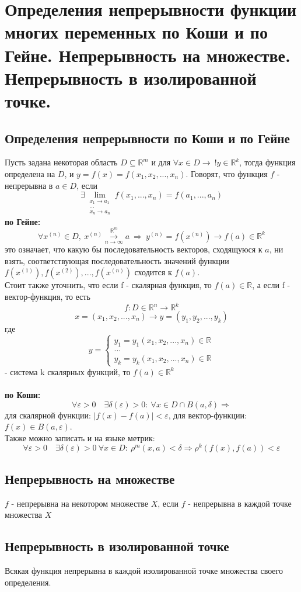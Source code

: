 \section{Определения непрерывности функции многих переменных по Коши и по Гейне.
Непрерывность на множестве.
Непрерывность в изолированной точке.}
\subsection{Определения непрерывности по Коши и по Гейне}
Пусть задана некоторая область $D \subseteq \mathbb{R}^m$ и для $ \forall x \in D \rightarrow \ ! y \in \mathbb{R}^{k}$, тогда функция определена на $D$, и $y=f(x)=f(x_{1}, x_{2}, ... , x_{n})$. Говорят, что функция $f$ - непрерывна в $a \in D$, если
$$
\exists \lim_{\substack{x_{1}\to a_{1}\\ ... \\{x_{n}\to a_{n}}}}{f(x_{1},..., x_{n})} = f(a_{1},..., a_{n})
$$
\textbf{по Гейне:}
$$
\forall x^{(n)} \in D, \ x^{(n)} \overset{\mathbb{R}^{m}}{\underset{n \rightarrow \infty}{\longrightarrow}} a \ \Rightarrow \
y^{(n)} = f(x^{(n)}) \rightarrow f(a) \in \mathbb{R}^{k}
$$
это означает, что какую бы последовательность векторов, сходящуюся к $a$, ни взять, соответствующая последовательность значений функции
$
f(x^{(1)}), f(x^{(2)}), ..., f(x^{(n)})
$
сходится к $f(a)$. \\
Стоит также уточнить, что если f - скалярная функция, то $f(a) \in \mathbb{R}$, а если f - вектор-функция, то есть
$$
f: D \in \mathbb{R}^{n} \rightarrow \mathbb{R}^{k}
$$
$$
x = (x_{1}, x_{2}, ... , x_{n}) \rightarrow y = (y_{1}, y_{2}, ... , y_{k})
$$
где
\begin{equation*}
y =
\begin{cases}
y_{1} =y_{1}(x_{1}, x_{2}, ... , x_{n}) \in \mathbb{R}\\
... \\
y_{k} =y_{k}(x_{1}, x_{2}, ... , x_{n}) \in \mathbb{R}
\end{cases}
\end{equation*}
- система k скалярных функций, то $f(a) \in \mathbb{R}^{k}$
\\\\
\textbf{по Коши:}
$$
\forall \varepsilon>0 \quad \exists \delta(\varepsilon)>0 :\ \forall x \in D \cap B(a, \delta)
\Rightarrow
$$
для скалярной функции: $|f(x) - f(a)| < \varepsilon$,
для вектор-функции: $f(x) \in B(a, \varepsilon)$.\\
Также можно записать и на языке метрик:
$$
\forall \varepsilon>0 \quad \exists \delta(\varepsilon)>0 \ \forall x \in D :\ \rho^{m}(x,a) < \delta
\Rightarrow \rho^{k}(f(x), f(a)) < \varepsilon
$$
\subsection{Непрерывность на множестве}
$f$ - непрерывна на некотором множестве $X$, если $f$ - непрерывна в каждой точке множества $X$

\subsection{Непрерывность в изолированной точке}
Всякая функция непрерывна в каждой изолированной точке множества своего определения.